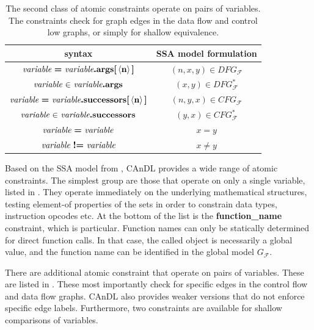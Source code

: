 \begin{table}[t]
  \centering
  \begin{tabular}{|c|c|}
    \hline
    syntax & SSA model formulation \\
    \hline
    \hline
    $\text{\it variable}\ \text{\bf =}\ \text{\it variable}\text{\bf.args[}\left<\text{\bf n}\right>\text{\bf]}$ & $(n,x,y)\in DFG_\mathcal F$\\
    $\text{\it variable}\ \text{\bf $\in$}\ \text{\it variable}\text{\bf .args}$ & $(x,y)\in DFG_\mathcal F^*$\\
    \hline
    $\text{\it variable}\ \text{\bf =}\ \text{\it variable}\text{\bf.successors[}\left<\text{\bf n}\right>\text{\bf]}$ & $(n,y,x)\in CFG_\mathcal F$\\
    $\text{\it variable}\ \text{\bf $\in$}\ \text{\it variable}\text{\bf .successors}$ & $(y,x)\in CFG_\mathcal F^*$\\
    \hline
    $\text{\it variable}\ \text{\bf =}\ \text{\it variable}$ & $x=y$\\
    $\text{\it variable}\ \text{\bf !=}\ \text{\it variable}$ & $x\neq y$\\
    \hline
  \end{tabular}
  \caption{The second class of atomic constraints operate on pairs of variables.
           The constraints check for graph edges in the
           data flow and control low graphs, or simply for shallow equivalence.
           \parfillskip=0pt}
  \label{twovaratomics}
\end{table}

    Based on the SSA model from , CAnDL provides a wide
    range of atomic constraints.
    The simplest group are those that operate on only a single variable,
    listed in .
    They operate immediately on the underlying mathematical structures, testing
    element-of properties of the sets in order to constrain data types,
    instruction opcodes etc.
    At the bottom of the list is the {\bf function\_name} constraint,
    which is particular.
    Function names can only be statically determined for direct function calls.
    In that case, the called object is necessarily a global value, and the
    function name can be identified in the global model $G_\mathcal F$.

    There are additional atomic constraint that operate on pairs of variables.
    These are listed in .
    These most importantly check for specific edges in the control flow and data
    flow graphs.
    CAnDL also provides weaker versions that do not enforce specific edge
    labels.
    Furthermore, two constraints are available for shallow comparisons of
    variables.


